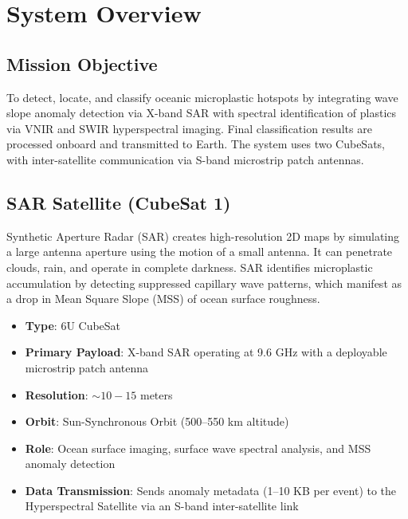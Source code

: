 \documentclass[12pt]{article}
\begin{document}
\section{System Overview}
\subsection{Mission Objective}
To detect, locate, and classify oceanic microplastic hotspots by integrating wave slope anomaly detection via X-band SAR with spectral identification of plastics via VNIR and SWIR hyperspectral imaging. Final classification results are processed onboard and transmitted to Earth. The system uses two CubeSats, with inter-satellite communication via S-band microstrip patch antennas.

\subsection{SAR Satellite (CubeSat 1)}
Synthetic Aperture Radar (SAR) creates high-resolution 2D maps by simulating a large antenna aperture using the motion of a small antenna. It can penetrate clouds, rain, and operate in complete darkness. SAR identifies microplastic accumulation by detecting suppressed capillary wave patterns, which manifest as a drop in Mean Square Slope (MSS) of ocean surface roughness.
\begin{itemize}
    \item \textbf{Type}: 6U CubeSat
    \item \textbf{Primary Payload}: X-band SAR operating at 9.6 GHz with a deployable microstrip patch antenna
    \item \textbf{Resolution}: $\sim 10-15$ meters
    \item \textbf{Orbit}: Sun-Synchronous Orbit (500--550 km altitude)
    \item \textbf{Role}: Ocean surface imaging, surface wave spectral analysis, and MSS anomaly detection
    \item \textbf{Data Transmission}: Sends anomaly metadata (1--10 KB per event) to the Hyperspectral Satellite via an S-band inter-satellite link
\end{itemize}
\end{document}
